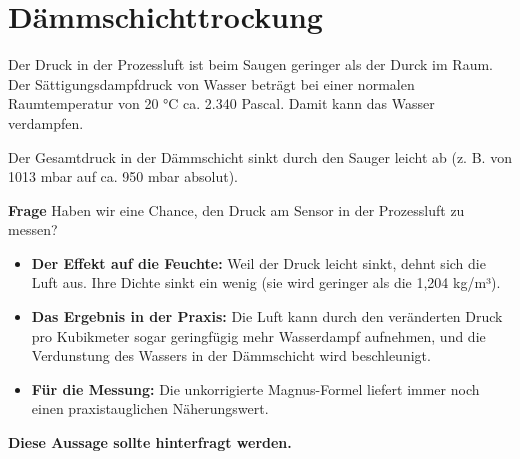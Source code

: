 
\section{Dämmschichttrockung}
Der Druck in der Prozessluft ist beim Saugen geringer als der Durck im Raum. Der Sättigungsdampfdruck von Wasser beträgt bei einer normalen Raumtemperatur von 20 °C ca. 2.340 Pascal. Damit kann das Wasser verdampfen. 

Der Gesamtdruck in der Dämmschicht sinkt durch den Sauger leicht ab (z. B. von 1013 mbar auf ca. 950 mbar absolut).

\textbf{Frage} Haben wir eine Chance, den Druck am Sensor in der Prozessluft zu messen?

\begin{itemize}
    \item \textbf{Der Effekt auf die Feuchte:} Weil der Druck leicht sinkt, dehnt sich die Luft aus. Ihre Dichte sinkt ein wenig (sie wird geringer als die 1,204 kg/m³).
    \item \textbf{Das Ergebnis in der Praxis:} Die Luft kann durch den veränderten Druck pro Kubikmeter sogar geringfügig mehr Wasserdampf aufnehmen, und die Verdunstung des Wassers in der Dämmschicht wird beschleunigt.
    \item \textbf{Für die Messung:} Die unkorrigierte Magnus-Formel liefert  immer noch einen praxistauglichen Näherungswert. 
\end{itemize}

\textbf{ Diese Aussage sollte hinterfragt werden.}
